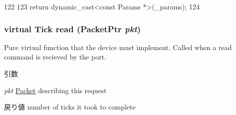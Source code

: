 \begin{DoxyCode}
122     {
123         return dynamic_cast<const Params *>(_params);
124     }
\end{DoxyCode}
\hypertarget{classPioDevice_a842312590432036092c422c87a442358}{
\subsubsection[{read}]{\setlength{\rightskip}{0pt plus 5cm}virtual {\bf Tick} read ({\bf PacketPtr} {\em pkt})}}
\label{classPioDevice_a842312590432036092c422c87a442358}
Pure virtual function that the device must implement. Called when a read command is recieved by the port. 
\begin{DoxyParams}{引数}
\item[{\em pkt}]\hyperlink{classPacket}{Packet} describing this request \end{DoxyParams}
\begin{DoxyReturn}{戻り値}
number of ticks it took to complete 
\end{DoxyReturn}


